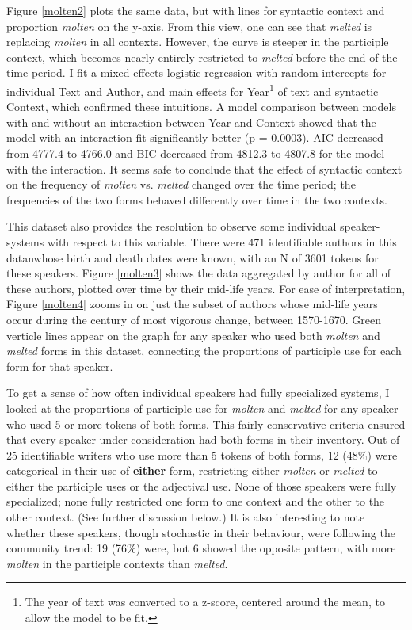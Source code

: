 \documentclass{artikel3}
\begin{document}
Figure \ref{molten2} plots the same data, but with lines for syntactic context and proportion \textsl{molten} on the y-axis. From this view, one can see that \textsl{melted} is replacing \textsl{molten} in all contexts. However, the curve is steeper in the participle context, which becomes nearly entirely restricted to \textsl{melted} before the end of the time period. I fit a mixed-effects logistic regression with random intercepts for individual Text and Author, and main effects for Year\footnote{The year of text was converted to a z-score, centered around the mean, to allow the model to be fit.} of text and syntactic Context, which confirmed these intuitions. A model comparison between models with and without an interaction between Year and Context showed that the model with an interaction fit significantly better (p = 0.0003). AIC decreased from 4777.4 to 4766.0 and BIC decreased from 4812.3 to 4807.8 for the model with the interaction. It seems safe to conclude that the effect of syntactic context on the frequency of \textsl{molten} vs. \textsl{melted} changed over the time period; the frequencies of the two forms behaved differently over time in the two contexts.

This dataset also provides the resolution to observe some individual speaker-systems with respect to this variable. There were 471 identifiable authors in this datanwhose birth and death dates were known, with an N of 3601 tokens for these speakers. Figure \ref{molten3} shows the data aggregated by author for all of these authors, plotted over time by their mid-life years. For ease of interpretation, Figure \ref{molten4} zooms in on just the subset of authors whose mid-life years occur during the century of most vigorous change, between 1570-1670. Green verticle lines appear on the graph for any speaker who used both \textsl{molten} and \textsl{melted} forms in this dataset, connecting the proportions of participle use for each form for that speaker.

To get a sense of how often individual speakers had fully specialized systems, I looked at the proportions of participle use for \textsl{molten} and \textsl{melted} for any speaker who used 5 or more tokens of both forms. This fairly conservative criteria ensured that every speaker under consideration had both forms in their inventory. Out of 25 identifiable writers who use more than 5 tokens of both forms, 12 (48\%) were categorical in their use of \textbf{either} form, restricting either \textsl{molten} or \textsl{melted} to either the participle uses or the adjectival use. None of those speakers were fully specialized; none fully restricted one form to one context and the other to the other context. (See further discussion below.) It is also interesting to note whether these speakers, though stochastic in their behaviour, were following the community trend: 19 (76\%) were, but 6 showed the opposite pattern, with more \textsl{molten} in the participle contexts than \textsl{melted}.
\end{document}
